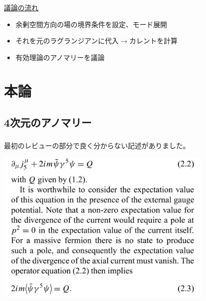 \documentclass[
  unicode,a4paper,10pt,
  xcolor = {dvipsnames,svgnames},
  hyperref ={colorlinks=true,citecolor=Navy,linkcolor=NavyBlue,urlcolor=purple},
  ja=standard,lualatex
]{beamer}
\begin{document}
\begin{frame}
  \frametitle{\subsecname}

  \uline{議論の流れ}

  \begin{itemize}
    \item 
    余剰空間方向の場の境界条件を設定、モード展開
    \item 
    それを元のラグランジアンに代入$\rightarrow$カレントを計算
    \item 
    有効理論のアノマリーを議論
  \end{itemize}

\end{frame}


\section{本論}

\begin{frame}[plain]
  \huge \secname
\end{frame}

\subsection{4次元のアノマリー}

\begin{frame}
  \frametitle{\subsecname} 

  最初のレビューの部分で良く分からない記述がありました。

  \begin{center}
    \includegraphics[width=0.8\textwidth]{fig/text_01.png}    
  \end{center}

\end{frame}
\end{document}
